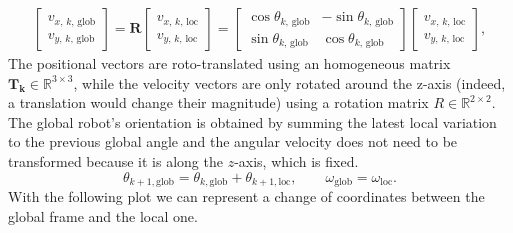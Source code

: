 \begin{align}
    \begin{bmatrix}
        v_{x,\,k,\,\text{glob} } \\[1ex]
        v_{y,\,k,\,\text{glob}}
    \end{bmatrix}
    = \mathbf{R} 
    \begin{bmatrix}
        v_{x,\,k,\,\text{loc} } \\[1ex]
        v_{y,\,k,\,\text{loc}}
    \end{bmatrix}
    =
    \begin{bmatrix}
        \cos\theta_{k,\, \text{glob}} & -\sin\theta_{k,\, \text{glob}} \\[1ex]
        \sin\theta_{k,\, \text{glob}} & \cos\theta_{k,\, \text{glob}}
    \end{bmatrix}
    \begin{bmatrix}
        v_{x,\,k,\,\text{loc} } \\[1ex]
        v_{y,\,k,\,\text{loc}}
    \end{bmatrix},
\end{align}
The positional vectors are roto-translated using an homogeneous matrix $ \mathbf{T_k} \in \mathbb{R}^{3\times3}$, while the velocity vectors are only rotated around the z-axis (indeed, a translation would change their magnitude) using a rotation matrix $R \in \mathbb{R}^{2\times2}$.\\
The global robot's orientation is obtained by summing the latest local variation to the previous global angle and the angular velocity does not need to be transformed because it is along the $z$-axis, which is fixed.
\begin{equation}
    \theta_{k+1, \text{glob}} = \theta_{k, \text{glob}} + \theta_{k+1, \text{loc}},
    \qquad
    \omega_{\text{glob}} = \omega_{\text{loc}}.
\end{equation}
With the following plot we can represent a change of coordinates between the global frame and the local one.
